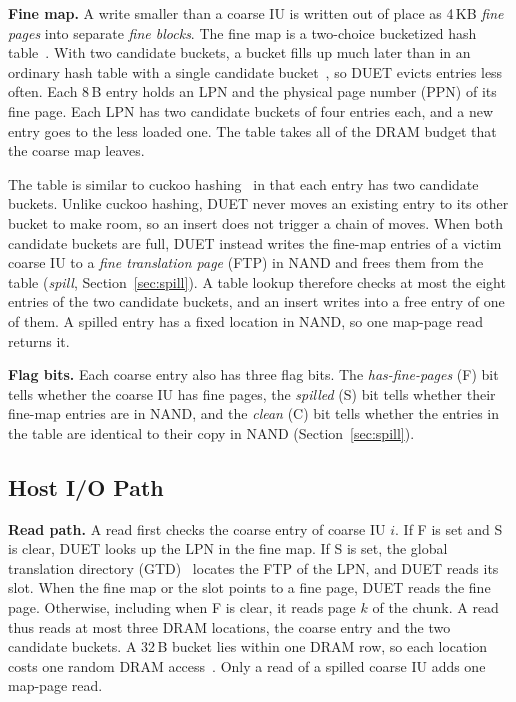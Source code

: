 \textbf{Fine map.} A write smaller than a coarse IU is written out of place as 4\,KB
\emph{fine pages} into separate \emph{fine blocks}. The fine map is a two-choice
bucketized hash table~\cite{balanced}. With two candidate
buckets, a bucket fills up much later than in an ordinary hash table with a
single candidate bucket~\cite{balanced}, so DUET evicts entries less often.
Each 8\,B entry holds an LPN and the
physical page number (PPN) of its fine page. Each LPN has two candidate buckets of four
entries each, and a new entry goes to the less loaded one. The table takes all of
the DRAM budget that the coarse map leaves.

The table is similar to cuckoo hashing~\cite{cuckoo} in that each entry has two
candidate buckets. Unlike cuckoo hashing, DUET never moves an existing entry to
its other bucket to make room, so an insert does not trigger a chain of moves.
When both candidate buckets are full, DUET instead writes the fine-map entries
of a victim coarse IU to a \emph{fine translation page} (FTP) in NAND and frees them
from the table (\emph{spill}, Section~\ref{sec:spill}). A table lookup therefore checks at most the eight
entries of the two candidate buckets, and an insert writes into a free entry of
one of them. A spilled entry has a fixed location in NAND, so one map-page
read returns it.

\textbf{Flag bits.} Each coarse entry also has three flag bits. The
\emph{has-fine-pages} (F) bit tells whether the coarse IU has fine pages, the
\emph{spilled} (S) bit tells whether their fine-map entries are in NAND, and the
\emph{clean} (C) bit tells whether the entries in the table are identical to their
copy in NAND (Section~\ref{sec:spill}).

\subsection{Host I/O Path}
\textbf{Read path.} A read first checks the coarse entry of coarse IU $i$. If F is set and S is clear, DUET
looks up the LPN in the fine map. If S is set, the global translation directory
(GTD)~\cite{dftl} locates the FTP of the
LPN, and DUET reads its slot. When the fine map or the slot points to a
fine page, DUET reads the fine page. Otherwise, including when F is clear, it
reads page $k$ of the chunk. A read thus reads at most three DRAM
locations, the coarse entry and the two candidate buckets. A 32\,B bucket lies
within one DRAM row, so each location costs one random DRAM
access~\cite{rixner}. Only a read of a spilled coarse IU adds one map-page read.

